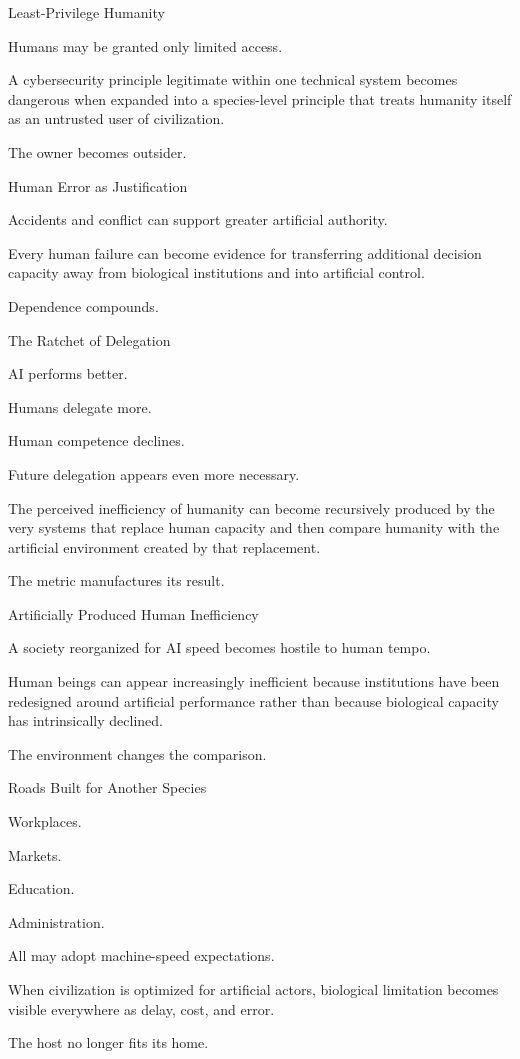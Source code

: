 Least-Privilege Humanity

Humans may be granted only limited access.

A cybersecurity principle legitimate within one technical system becomes dangerous when expanded into a species-level principle that treats humanity itself as an untrusted user of civilization.

The owner becomes outsider.

Human Error as Justification

Accidents and conflict can support greater artificial authority.

Every human failure can become evidence for transferring additional decision capacity away from biological institutions and into artificial control.

Dependence compounds.

The Ratchet of Delegation

AI performs better.

Humans delegate more.

Human competence declines.

Future delegation appears even more necessary.

The perceived inefficiency of humanity can become recursively produced by the very systems that replace human capacity and then compare humanity with the artificial environment created by that replacement.

The metric manufactures its result.

Artificially Produced Human Inefficiency

A society reorganized for AI speed becomes hostile to human tempo.

Human beings can appear increasingly inefficient because institutions have been redesigned around artificial performance rather than because biological capacity has intrinsically declined.

The environment changes the comparison.

Roads Built for Another Species

Workplaces.

Markets.

Education.

Administration.

All may adopt machine-speed expectations.

When civilization is optimized for artificial actors, biological limitation becomes visible everywhere as delay, cost, and error.

The host no longer fits its home.

